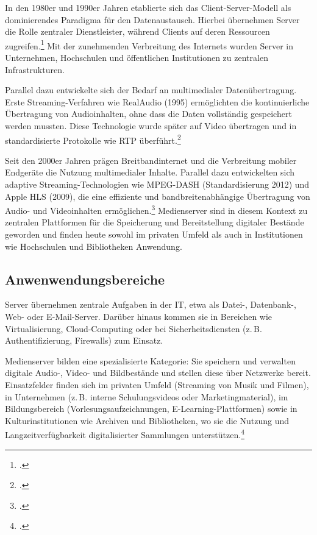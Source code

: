 \documentclass[12pt,a4paper]{report}
\begin{document}
  In den 1980er und 1990er Jahren etablierte sich das Client-Server-Modell als dominierendes Paradigma für den Datenaustausch. 
  Hierbei übernehmen Server die Rolle zentraler Dienstleister, 
  während Clients auf deren Ressourcen zugreifen.\footcite[Vgl.][S.~114]{kurose_networking} 
  Mit der zunehmenden Verbreitung des Internets wurden Server in Unternehmen, 
  Hochschulen und öffentlichen Institutionen zu zentralen Infrastrukturen.

  Parallel dazu entwickelte sich der Bedarf an multimedialer Datenübertragung. 
  Erste Streaming-Verfahren wie RealAudio (1995) ermöglichten die kontinuierliche Übertragung von Audioinhalten, 
  ohne dass die Daten vollständig gespeichert werden mussten. 
  Diese Technologie wurde später auf Video übertragen 
  und in standardisierte Protokolle wie \ac{RTP} überführt.\footcite[Vgl.][S.~11~ff., S.~273~ff.]{steinmetz_multimedia}

  Seit den 2000er Jahren prägen Breitbandinternet und die Verbreitung mobiler Endgeräte die Nutzung multimedialer Inhalte. 
  Parallel dazu entwickelten sich adaptive Streaming-Technologien wie \ac{MPEG-DASH} (Standardisierung 2012)
  und Apple \ac{HLS} (2009), die eine effiziente und bandbreitenabhängige Übertragung von Audio- 
  und Videoinhalten ermöglichen.\footcite[Vgl.]{iso_mpegdash, apple_hls}
  Medienserver sind in diesem Kontext zu zentralen Plattformen für die Speicherung und Bereitstellung digitaler Bestände geworden 
  und finden heute sowohl im privaten Umfeld als auch in Institutionen wie Hochschulen und Bibliotheken Anwendung.

  \subsection{Anwenwendungsbereiche}
  Server übernehmen zentrale Aufgaben in der \ac{IT}, etwa als Datei-, Datenbank-, Web- oder E-Mail-Server. 
  Darüber hinaus kommen sie in Bereichen wie Virtualisierung, Cloud-Computing
  oder bei Sicherheitsdiensten (z.\,B. Authentifizierung, Firewalls) zum Einsatz.

  Medienserver bilden eine spezialisierte Kategorie: Sie speichern und verwalten
  digitale Audio-, Video- und Bildbestände und stellen diese über Netzwerke bereit.
  Einsatzfelder finden sich im privaten Umfeld (Streaming von Musik und Filmen),
  in Unternehmen (z.\,B. interne Schulungsvideos oder Marketingmaterial),
  im Bildungsbereich (Vorlesungsaufzeichnungen, E-Learning-Plattformen) sowie
  in Kulturinstitutionen wie Archiven und Bibliotheken, wo sie die Nutzung und
  Langzeitverfügbarkeit digitalisierter Sammlungen unterstützen.\footcite[Vgl.][S.~131~ff.]{steinmetz_multimedia}
\end{document}

